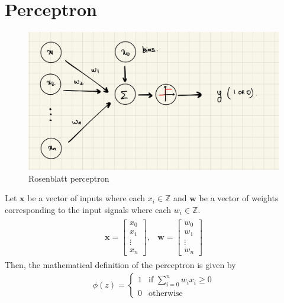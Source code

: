 \section{Perceptron}
\begin{figure}[ht]
  \centering
  \includegraphics[scale=0.15]{CHAPTER_2/c2_fig_perceptron_2.jpeg}
  \caption{Rosenblatt perceptron}
  \label{rosenblatt_perceptron}
\end{figure}
\vspace{5mm}
\noindent Let $\textbf{x}$ be a vector of inputs where each $x_i \in \mathbb{Z}$ and $\textbf{w}$ be a vector of weights corresponding to the input signals where each $w_i \in \mathbb{Z}$. 
\begin{align}
  \begin{matrix}
    \textbf{x} = \begin{bmatrix}
      x_{0} \\
      x_{1} \\
      \vdots \\
      x_{n}
    \end{bmatrix}, & \textbf{w} = \begin{bmatrix}
      w_{0} \\
      w_{1} \\
      \vdots \\
      w_{n}
    \end{bmatrix}
  \end{matrix} \nonumber
\end{align}
\noindent Then, the mathematical definition of the perceptron is given by
\begin{align}
  \phi(z) = \begin{cases}
    1 & \text{if } \sum^{n}_{i=0} w_ix_i \geq  0\\
    0 & \text{otherwise}
    \label{eq:mcp_neuron}
  \end{cases}
\end{align}
